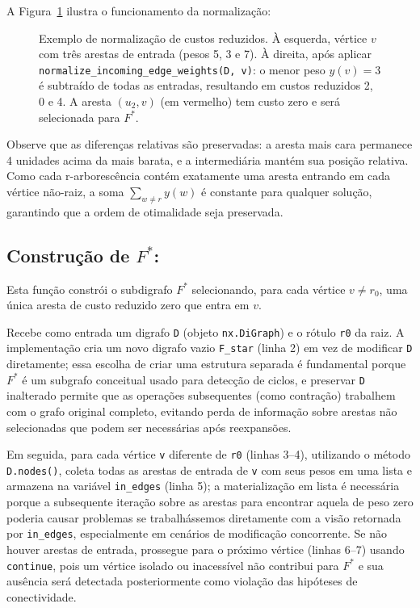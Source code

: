 A Figura~\ref{fig:normalize-example} ilustra o funcionamento da normalização:

\begin{figure}[H]
    \centering
    
    \caption{Exemplo de normalização de custos reduzidos. À esquerda, vértice \(v\) com três arestas de entrada (pesos 5, 3 e 7). À direita, após aplicar \texttt{normalize\_incoming\_edge\_weights(D, v)}: o menor peso \(y(v)=3\) é subtraído de todas as entradas, resultando em custos reduzidos 2, 0 e 4. A aresta \((u_2,v)\) (em vermelho) tem custo zero e será selecionada para \(F^*\).}
    \label{fig:normalize-example}
\end{figure}

Observe que as diferenças relativas são preservadas: a aresta mais cara permanece 4 unidades acima da mais barata, e a intermediária mantém sua posição relativa. Como cada r-arborescência contém exatamente uma aresta entrando em cada vértice não-raiz, a soma \(\sum_{w\neq r} y(w)\) é constante para qualquer solução, garantindo que a ordem de otimalidade seja preservada.

\subsection{Construção de \texorpdfstring{\(F^*\)}{F*}:}
Esta função constrói o subdigrafo \(F^*\) selecionando, para cada vértice \(v\neq r_0\), uma única aresta de custo reduzido zero que entra em \(v\).

Recebe como entrada um digrafo \texttt{D} (objeto \texttt{nx.DiGraph}) e o rótulo \texttt{r0} da raiz. A implementação cria um novo digrafo vazio \texttt{F\_star} (linha 2) em vez de modificar \texttt{D} diretamente; essa escolha de criar uma estrutura separada é fundamental porque \(F^*\) é um subgrafo conceitual usado para detecção de ciclos, e preservar \texttt{D} inalterado permite que as operações subsequentes (como contração) trabalhem com o grafo original completo, evitando perda de informação sobre arestas não selecionadas que podem ser necessárias após reexpansões.

Em seguida, para cada vértice \texttt{v} diferente de \texttt{r0} (linhas 3--4), utilizando o método \texttt{D.nodes()}, coleta todas as arestas de entrada de \texttt{v} com seus pesos em uma lista e armazena na variável \texttt{in\_edges} (linha 5); a materialização em lista é necessária porque a subsequente iteração sobre as arestas para encontrar aquela de peso zero poderia causar problemas se trabalhássemos diretamente com a visão retornada por \texttt{in\_edges}, especialmente em cenários de modificação concorrente. Se não houver arestas de entrada, prossegue para o próximo vértice (linhas 6--7) usando \texttt{continue}, pois um vértice isolado ou inacessível não contribui para \(F^*\) e sua ausência será detectada posteriormente como violação das hipóteses de conectividade.

